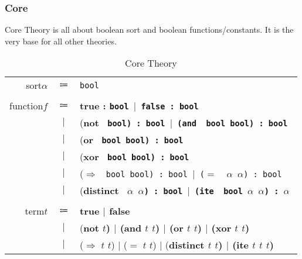 \documentclass[11pt,letter]{article}
\theoremstyle{definition}
\begin{document}
\subsubsection{Core}
Core Theory is all about boolean sort and boolean functions/constants. It is the very base for all other theories.
\begin{table}[h]
\begin{mdframed}
\centering
\begin{tabular}{r c l}
sort\qquad $\alpha$ & $\Coloneqq$ & \tt bool\\
\\
function\qquad $f$ & $\Coloneqq$ & \bf true \rm : \tt bool  $\mid$ \bf false \rm : \tt bool \\
& $\mid$ & (\bf not \tt\ bool\rm) : \tt bool $\mid$ \rm(\bf and \tt\ bool bool\rm) : \tt bool \\
& $\mid$ & (\bf or \tt\ bool bool\rm) : \tt bool \\
& $\mid$ & (\bf xor \tt\ bool bool\rm) : \tt bool \\
& $\mid$ & ($\Rightarrow$ \tt\ bool bool\rm) : \tt bool $\mid$ \rm($=$ \tt\ $\alpha$ $\alpha$\rm) : \tt bool\\
& $\mid$ & (\bf distinct \tt\ $\alpha$ $\alpha$\rm) : \tt bool $\mid$ \rm(\bf ite \tt\ bool $\alpha$ $\alpha$\rm) : $\alpha$\\
\\
term\qquad $t$ & $\Coloneqq$ & \bf true $\mid$ false\\
& $\mid$ & (\bf not \rm $t$) $\mid$ (\bf and \rm $t$ $t$) $\mid$ (\bf or \rm $t$ $t$) $\mid$ (\bf xor \rm $t$ $t$) \\
& $\mid$ & ($\Rightarrow$ $t$ $t$) $\mid$ ($=$ $t$ $t$) $\mid$ (\bf distinct \rm $t$ $t$) $\mid$ (\bf ite \rm $t$ $t$ $t$)
\end{tabular}
\end{mdframed}
\caption{Core Theory}
\end{table}
\end{document}
